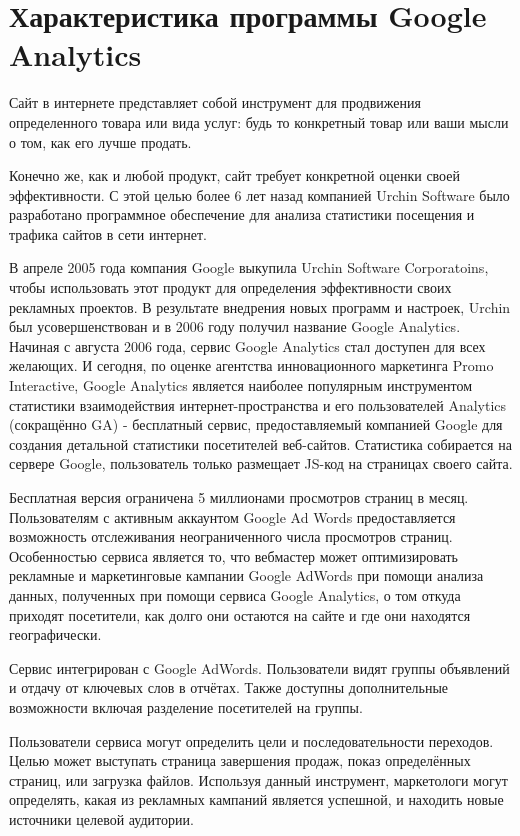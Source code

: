 \documentclass[a4paper,english,russian]{G2-105}
\begin{document}
\section{Характеристика программы Google Analytics}
\par Сайт в интернете представляет собой инструмент для продвижения определенного товара или вида услуг: будь то конкретный товар или ваши мысли о том, как его лучше продать.
\par Конечно же, как и любой продукт, сайт требует конкретной оценки своей эффективности.
С этой целью более 6 лет назад компанией Urchin Software было разработано программное обеспечение для анализа статистики посещения и трафика сайтов в сети интернет.
\par В апреле 2005 года компания Google выкупила Urchin Software Corporatoins, чтобы использовать этот продукт для определения эффективности своих рекламных проектов. В результате внедрения новых программ и настроек, Urchin был усовершенствован и в 2006 году получил название Google Analytics. Начиная с августа 2006 года, сервис Google Analytics стал доступен для всех желающих. И сегодня, по оценке агентства инновационного маркетинга Promo Interactive, Google Analytics является наиболее популярным инструментом статистики взаимодействия интернет-пространства и его пользователей Analytics (сокращённо GA) - бесплатный сервис, предоставляемый компанией Google для создания детальной статистики посетителей веб-сайтов. Статистика собирается на сервере Google, пользователь только размещает JS-код на страницах своего сайта.
\par Бесплатная версия ограничена 5 миллионами просмотров страниц в месяц. Пользователям с активным аккаунтом Google Ad Words предоставляется возможность отслеживания неограниченного числа просмотров страниц. Особенностью сервиса является то, что вебмастер может оптимизировать рекламные и маркетинговые кампании Google AdWords при помощи анализа данных, полученных при помощи сервиса Google Analytics, о том откуда приходят посетители, как долго они остаются на сайте и где они находятся географически.
\par Сервис интегрирован с Google AdWords. Пользователи видят группы объявлений и отдачу от ключевых слов в отчётах. Также доступны дополнительные возможности включая разделение посетителей на группы.
\par Пользователи сервиса могут определить цели и последовательности переходов. Целью может выступать страница завершения продаж, показ определённых страниц, или загрузка файлов. Используя данный инструмент, маркетологи могут определять, какая из рекламных кампаний является успешной, и находить новые источники целевой аудитории.
\end{document}
